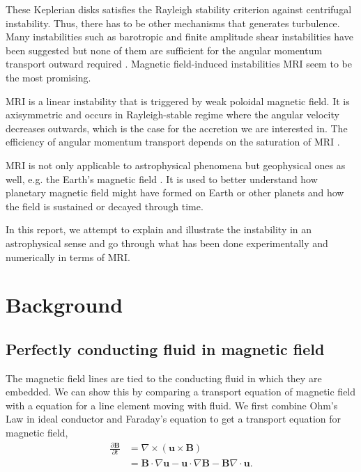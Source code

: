 \documentclass{jfm}
\newcommand{\del}{\nabla}
\begin{document}
These Keplerian disks satisfies the Rayleigh stability criterion
\citep[see][]{Rayleigh1916} against centrifugal instability.  Thus, there has
to be other mechanisms that generates turbulence. Many instabilities such as
barotropic \citep{Dubrulle2005b} and finite amplitude shear instabilities
\citep{Dubrulle2005a, Lesur2005} have been suggested but none of them are
sufficient for the angular momentum transport outward required \citep{Ji2006}.
Magnetic field-induced instabilities MRI seem to be the most promising. 

MRI is a linear instability that is triggered by weak poloidal magnetic field.
It is axisymmetric and occurs in Rayleigh-stable regime where the angular
velocity decreases outwards, which is the case for the accretion we are
interested in. The efficiency of angular momentum transport depends on the
saturation of MRI \citep{Balbus1991, Balbus1998}.

MRI is not only applicable to astrophysical phenomena but geophysical ones as
well, e.g. the Earth's magnetic field \citep{Petitdemange2008}. It is used to
better understand how planetary magnetic field might  have formed on Earth or
other planets and how the field is sustained or decayed through time.

In this report, we attempt to explain and illustrate the instability in an
astrophysical sense and go through what has been done experimentally and
numerically in terms of MRI.



\section{Background}

%
%
\subsection{Perfectly conducting fluid in magnetic field}

The magnetic field lines are tied to the conducting fluid in which they are 
embedded. We can show this by comparing a transport equation of magnetic field
with a equation for a line element moving with fluid. We first combine Ohm's 
Law in ideal conductor and Faraday's equation to get a transport equation for 
magnetic field,
\begin{align}
    \frac{\partial \mathbf{B}}{\partial t} &= \del \times (\mathbf{u}\times \mathbf{B}) \nonumber \\
    &=\mathbf{B}\cdot\del \mathbf{u} - {\mathbf{u}\cdot\del}\mathbf{B} -\mathbf{B}\del\cdot\mathbf{u}.
\end{align}
\end{document}

